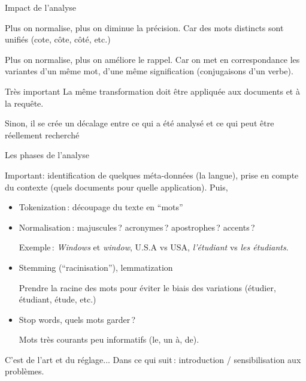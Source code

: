 \begin{frame}{Impact de l'analyse}


\alert{Plus on normalise, plus on diminue la précision}.
\smallskip
Car des mots distincts sont unifiés (cote, côte, côté, etc.)

\vfill

\alert{Plus on normalise, plus on améliore le rappel}.
\smallskip
Car on met en correspondance les variantes d'un même mot, d'une même
signification (conjugaisons d'un verbe).

\vfill

  \begin{defblock}{Très important}
    La même transformation doit être appliquée aux documents \alert{et} à la
    requête. 
  \end{defblock}
  \vfill
\begin{blocgauche}
Sinon, il se crée un décalage entre ce qui a été analysé et ce qui peut
      être réellement recherché
  \end{blocgauche}
  
\vfill

\end{frame}

\begin{frame}{Les phases de l'analyse}

Important: identification de quelques méta-données (la langue), prise en compte du contexte
(quels documents pour quelle application). Puis, 

\vfill

\begin{itemize}
\item \alert{Tokenization}\,: découpage du texte en ``mots''
\item \alert{Normalisation}\,: majuscules\,? acronymes\,? apostrophes\,? accents\,?

     Exemple\,: \textit{Windows} et \textit{window}, U.S.A vs USA,
     \emph{l'étudiant}  vs \emph{les étudiants}.
     
     \item \alert{Stemming} (``racinisation''), \alert{lemmatization}
     
     Prendre la racine des mots pour éviter le biais des variations (étudier,
     étudiant, étude, etc.)
     
     \item  \alert{Stop words}, quels mots garder\,?
     
     Mots très courants peu informatifs (le, un à, de).
\end{itemize}

\begin{blocgauche}
C'est de l'art et du réglage... Dans ce qui suit\,: introduction /
sensibilisation aux problèmes.
\end{blocgauche}

\end{frame}

